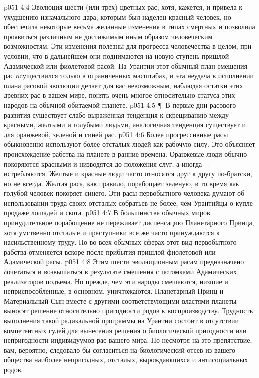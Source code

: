 \vs p051 4:4 Эволюция шести (или трех) цветных рас, хотя, кажется, и привела к ухудшению изначального дара, которым был наделен красный человек, но обеспечила некоторые весьма желанные изменения в типах смертных и позволила проявиться различным не достижимым иным образом человеческим возможностям. Эти изменения полезны для прогресса человечества в целом, при условии, что в дальнейшем они поднимаются на новую ступень пришлой Адамической или фиолетовой расой. На Урантии этот обычный план смешения рас ocyществился только в ограниченных масштабах, и эта неудача в исполнении плана расовой эволюции делает для вас невозможным, наблюдая остатки этих древних рас в вашем мире, понять очень многое относительно статуса этих народов на обычной обитаемой планете.
\vs p051 4:5 \P\ В первые дни расового развития существует слабо выраженная тенденция к скрещиванию между красными, желтыми и голубыми людьми, аналогичная тенденция существует и для оранжевой, зеленой и синей рас.
\vs p051 4:6 Более прогрессивные расы обыкновенно используют более отсталых людей как рабочую силу. Это объясняет происхождение рабства на планете в ранние времена. Оранжевые люди обычно покоряются красными и низводятся до положения слуг, а иногда --- истребляются. Желтые и красные люди часто относятся друг к другу по\hyp{}братски, но не всегда. Желтая раса, как правило, порабощает зеленую, в то время как голубой человек покоряет синего. Эти расы первобытного человека думают об использовании труда своих отсталых собратьев не более, чем Урантийцы о купле\hyp{}продаже лошадей и скота.
\vs p051 4:7 В большинстве обычных миров принудительное порабощение не переживает диспенсацию Планетарного Принца, хотя умственно отсталые и преступники все же часто принуждаются к насильственному труду. Но во всех обычных сферах этот вид первобытного рабства отменяется вскоре после прибытия пришлой фиолетовой или Адамической расы.
\vs p051 4:8 Этим шести эволюционным расам предназначено cочетаться и возвышаться в результате смешения с потомками Адамических реализаторов подъема. Но прежде, чем эти народы смешаются, низшие и неприспособленные, в основном, уничтожаются. Планетарный Принц и Материальный Сын вместе с другими соответствующими властями планеты выносят решение относительно пригодности родов к воспроизводству. Трудность выполнения такой радикальной программы на Урантии состоит в отсутствии компетентных судей для вынесения решения о биологической пригодности или непригодности индивидуумов рас вашего мира. Но несмотря на это препятствие, вам, вероятно, следовало бы согласиться на биологический отсев из вашего общества наиболее непригодных, отсталых, вырождающихся и антисоциальных родов.
